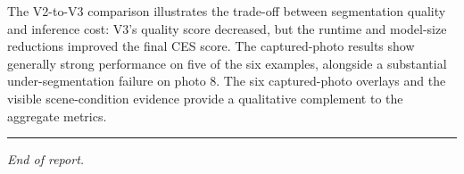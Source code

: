 \documentclass[10pt,a4paper]{article}
\begin{document}
The V2-to-V3 comparison illustrates the trade-off between segmentation quality and inference cost: V3's quality score decreased, but the runtime and model-size reductions improved the final CES score. The captured-photo results show generally strong performance on five of the six examples, alongside a substantial under-segmentation failure on photo 8. The six captured-photo overlays and the visible scene-condition evidence provide a qualitative complement to the aggregate metrics.

\vspace{5pt}
\hrule
\vspace{3pt}
{\small\color{muted}\textit{End of report.}}
\end{document}
